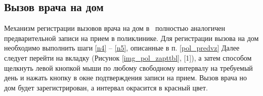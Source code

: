 \subsection{Вызов врача на дом} \label{pol_home}

Механизм регистрации вызовов врача на дом в \tmis~полностью аналогичен предварительной записи на прием в поликлинике. Для регистрации вызова на дом необходимо выполнить шаги \ref{n4} -- \ref{n5}, описанные в п. \ref{pol_predvz} Далее следует перейти на вкладку  (Рисунок \ref{img_pol_zapttbl}, [1]), а затем способом щелкнуть левой кнопкой мыши по любому свободному интервалу на требуемый день и нажать кнопку  в окне подтверждения записи на прием. Вызов врача но дом будет зарегистрирован, а интервал окрасится в красный цвет.
